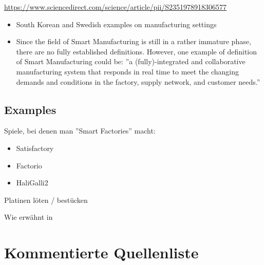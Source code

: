 \documentclass[11pt,titlepage]{article}
\begin{document}
  \url{https://www.sciencedirect.com/science/article/pii/S2351978918306577}
  \begin{itemize}
    \item South Korean and Swedish examples on manufacturing settings
    \item Since the field of Smart Manufacturing is still in a rather immature phase, there are no fully established
    definitions. However, one example of definition of Smart Manufacturing could be: ''a (fully)-integrated and
    collaborative manufacturing system that responds in real time to meet the changing demands and conditions in the
    factory, supply network, and customer needs.''
  \end{itemize}


  \subsection{Examples}
  \label{sec:Brainstorm_Examples}

  Spiele, bei denen man ''Smart Factories'' macht:
  \begin{itemize}
    \item Satisfactory 
    \item Factorio
    \item HaliGalli2
  \end{itemize}


Platinen löten / bestücken

Wie erwähnt in \cite{RICHARDS.2020}

\pagebreak

\section{Kommentierte Quellenliste}
\label{sec:KommentierteQuellenliste}
  
\begingroup
\renewcommand{\section}[2]{}%


\endgroup  
  
\end{document}

